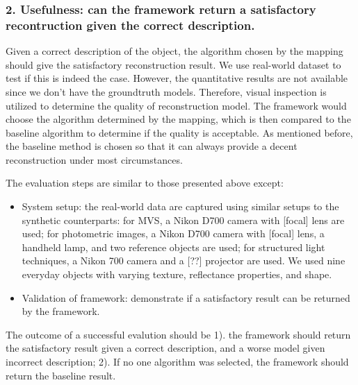 \subsubsection{2. Usefulness: can the framework return a satisfactory recontruction given the correct description.}
Given a correct description of the object, the algorithm chosen by the mapping should give the satisfactory reconstruction result. We use real-world dataset to test if this is indeed the case. However, the quantitative results are not available since we don't have the groundtruth models. Therefore, visual inspection is utilized to determine the quality of reconstruction model. The framework would choose the algorithm determined by the mapping, which is then compared to the baseline algorithm to determine if the quality is acceptable. As mentioned before, the baseline method is chosen so that it can always provide a decent reconstruction under most circumstances.

The evaluation steps are similar to those presented above except:
\begin{itemize}
\item System setup: the real-world data are captured using similar setups to the synthetic counterparts: for MVS, a Nikon D700 camera with [focal] lens are used; for photometric images, a Nikon D700 camera with [focal] lens, a handheld lamp, and two reference objects are used; for structured light techniques, a Nikon 700 camera and a [??] projector are used. We used nine everyday objects with varying texture, reflectance properties, and shape.
\item Validation of framework: demonstrate if a satisfactory result can be returned by the framework.
\end{itemize}

The outcome of a successful evalution should be 1). the framework should return the satisfactory result given a correct description, and a worse model given incorrect description; 2). If no one algorithm was selected, the framework should return the baseline result.



